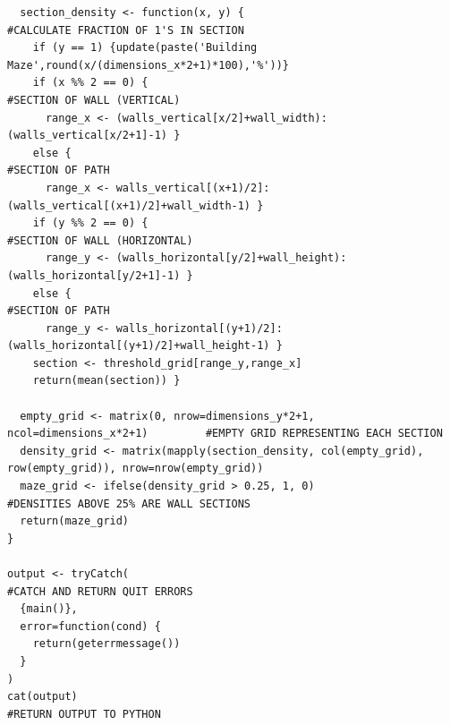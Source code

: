 \documentclass[titlepage]{article}
\begin{document}
\begin{changemargin}{-1in}{-1in}
\begin{verbatim}
  section_density <- function(x, y) {                                           #CALCULATE FRACTION OF 1'S IN SECTION
    if (y == 1) {update(paste('Building Maze',round(x/(dimensions_x*2+1)*100),'%'))}
    if (x %% 2 == 0) {                                                          #SECTION OF WALL (VERTICAL)
      range_x <- (walls_vertical[x/2]+wall_width):(walls_vertical[x/2+1]-1) }
    else {                                                                      #SECTION OF PATH
      range_x <- walls_vertical[(x+1)/2]:(walls_vertical[(x+1)/2]+wall_width-1) }
    if (y %% 2 == 0) {                                                          #SECTION OF WALL (HORIZONTAL)
      range_y <- (walls_horizontal[y/2]+wall_height):(walls_horizontal[y/2+1]-1) }
    else {                                                                      #SECTION OF PATH
      range_y <- walls_horizontal[(y+1)/2]:(walls_horizontal[(y+1)/2]+wall_height-1) }
    section <- threshold_grid[range_y,range_x]
    return(mean(section)) }

  empty_grid <- matrix(0, nrow=dimensions_y*2+1, ncol=dimensions_x*2+1)         #EMPTY GRID REPRESENTING EACH SECTION
  density_grid <- matrix(mapply(section_density, col(empty_grid), row(empty_grid)), nrow=nrow(empty_grid))
  maze_grid <- ifelse(density_grid > 0.25, 1, 0)                                #DENSITIES ABOVE 25% ARE WALL SECTIONS
  return(maze_grid)
}

output <- tryCatch(                                                             #CATCH AND RETURN QUIT ERRORS
  {main()},
  error=function(cond) {
    return(geterrmessage())
  }
)
cat(output)                                                                     #RETURN OUTPUT TO PYTHON
\end{verbatim}
\end{changemargin} 


\pagebreak
\end{document}
